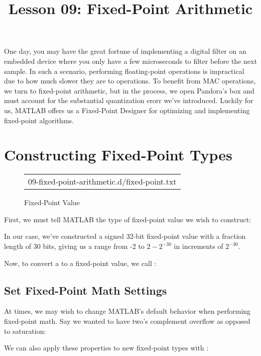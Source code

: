 \documentclass{article}
\title{Lesson 09: Fixed-Point Arithmetic}
\begin{document}
\renderTitle

One day, you may have the great fortune of implementing a digital filter
on an embedded device where you only have a few microseconds to filter
before the next sample.  In such a scenario, performing floating-point
operations is impractical due to how much slower they are to  operations.  To benefit from MAC operations,
we turn to fixed-point arithmetic, but in the process, we open Pandora's
box and must account for the substantial quantization erorr we've
introduced.  Luckily for us, MATLAB offers us a Fixed-Point Designer%
 for
optimizing and implementing fixed-point algorithms.

\section{Constructing Fixed-Point Types}

\begin{figure}[!ht]
\Centering
\small
\begin{tabular}{c}
	{09-fixed-point-arithmetic.d/fixed-point.txt}
\end{tabular}
\caption{Fixed-Point Value}
\end{figure}

First, we must tell MATLAB the type of fixed-point value we wish to
construct:


In our case, we've constructed a signed 32-bit fixed-point value with a
fraction length of 30 bits, giving us a range from -2 to \(2 - 2^{-30}\)
in increments of \(2^{-30}\).

Now, to convert a  to a fixed-point value, we call
:


\subsection{Set Fixed-Point Math Settings}

At times, we may wish to change MATLAB's default behavior when
performing fixed-point math.  Say we wanted to have two's complement
overflow as opposed to saturation:



We can also apply these properties to new fixed-point types with
:

\end{document}
